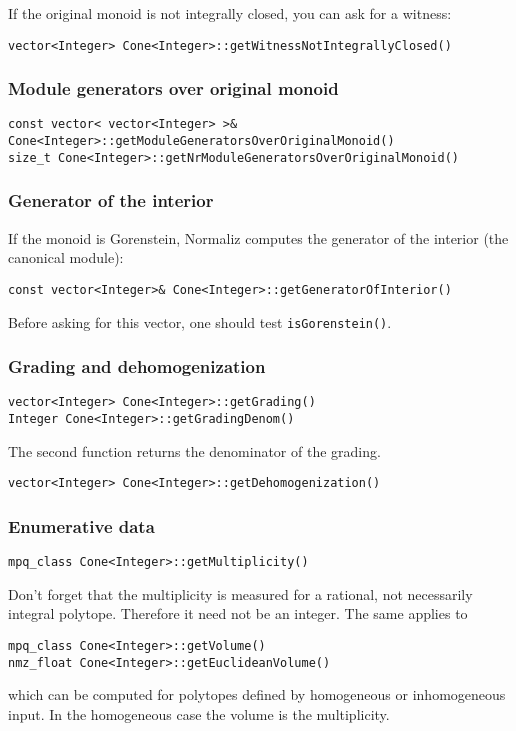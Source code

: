 \documentclass[12pt,a4paper]{scrartcl}
\theoremstyle{definition}
\begin{document}
\begin{small}
If the original monoid is not integrally closed, you can ask for a witness:
\begin{Verbatim}
vector<Integer> Cone<Integer>::getWitnessNotIntegrallyClosed()
\end{Verbatim}

\subsubsection{Module generators over original monoid}

\begin{Verbatim}
const vector< vector<Integer> >& 
Cone<Integer>::getModuleGeneratorsOverOriginalMonoid()
size_t Cone<Integer>::getNrModuleGeneratorsOverOriginalMonoid()
\end{Verbatim}

\subsubsection{Generator of the interior}\label{GenInt}

If the monoid is Gorenstein, Normaliz computes the generator of the interior (the canonical module):
\begin{Verbatim}
const vector<Integer>& Cone<Integer>::getGeneratorOfInterior()
\end{Verbatim}
Before asking for this vector, one should test \verb|isGorenstein()|. 

\subsubsection{Grading and dehomogenization}

\begin{Verbatim}
vector<Integer> Cone<Integer>::getGrading()
Integer Cone<Integer>::getGradingDenom()
\end{Verbatim}
The second function returns the denominator of the grading.

\begin{Verbatim}
vector<Integer> Cone<Integer>::getDehomogenization()
\end{Verbatim}

\subsubsection{Enumerative data}

\begin{Verbatim}
mpq_class Cone<Integer>::getMultiplicity()
\end{Verbatim}
Don't forget that the multiplicity is measured for a rational, not necessarily integral polytope. Therefore it need not be an integer. The same applies to
\begin{Verbatim}
mpq_class Cone<Integer>::getVolume()
nmz_float Cone<Integer>::getEuclideanVolume()
\end{Verbatim}
which can be computed for polytopes defined by homogeneous or inhomogeneous input. In the homogeneous case the volume is the multiplicity.


\end{small}
\end{document}
